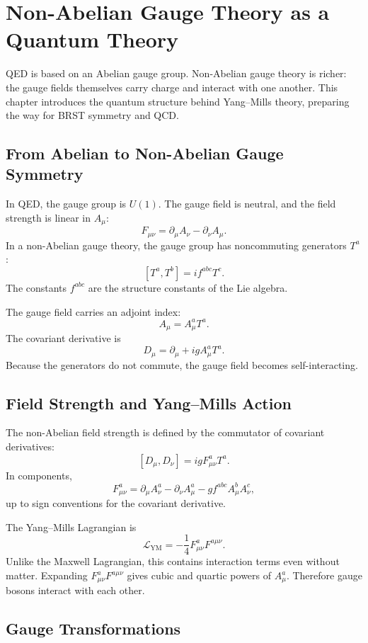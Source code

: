 \chapter{Non-Abelian Gauge Theory as a Quantum Theory}

\begin{remarkbox}
QED is based on an Abelian gauge group. Non-Abelian gauge theory is richer: the
gauge fields themselves carry charge and interact with one another. This chapter
introduces the quantum structure behind Yang--Mills theory, preparing the way for
BRST symmetry and QCD.
\end{remarkbox}

\section{From Abelian to Non-Abelian Gauge Symmetry}

In QED, the gauge group is \(U(1)\). The gauge field is neutral, and the field
strength is linear in \(A_\mu\):
\[
    F_{\mu\nu}=\partial_\mu A_\nu-\partial_\nu A_\mu.
\]
In a non-Abelian gauge theory, the gauge group has noncommuting generators
\(T^a\):
\[
    [T^a,T^b]=if^{abc}T^c.
\]
The constants \(f^{abc}\) are the structure constants of the Lie algebra.

The gauge field carries an adjoint index:
\[
    A_\mu=A_\mu^aT^a.
\]
The covariant derivative is
\[
    D_\mu=\partial_\mu+igA_\mu^aT^a.
\]
Because the generators do not commute, the gauge field becomes self-interacting.

\section{Field Strength and Yang--Mills Action}

The non-Abelian field strength is defined by the commutator of covariant
derivatives:
\[
    [D_\mu,D_\nu]=igF_{\mu\nu}^aT^a.
\]
In components,
\[
    F_{\mu\nu}^a
    =\partial_\mu A_\nu^a-\partial_\nu A_\mu^a
      -g f^{abc}A_\mu^bA_\nu^c,
\]
up to sign conventions for the covariant derivative.

The Yang--Mills Lagrangian is
\[
    \mathcal{L}_{\mathrm{YM}}
    = -\frac{1}{4}F_{\mu\nu}^aF^{a\mu\nu}.
\]
Unlike the Maxwell Lagrangian, this contains interaction terms even without
matter. Expanding \(F_{\mu\nu}^aF^{a\mu\nu}\) gives cubic and quartic powers of
\(A_\mu^a\). Therefore gauge bosons interact with each other.

\section{Gauge Transformations}

